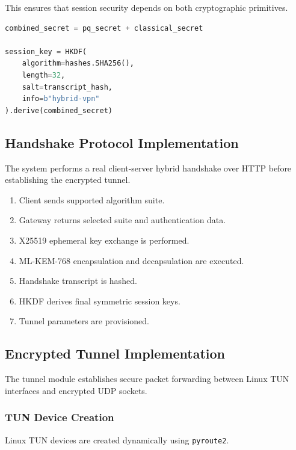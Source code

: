 This ensures that session security depends on both cryptographic primitives.

\begin{lstlisting}[language=Python, caption={Hybrid Session Key Derivation}]
combined_secret = pq_secret + classical_secret

session_key = HKDF(
    algorithm=hashes.SHA256(),
    length=32,
    salt=transcript_hash,
    info=b"hybrid-vpn"
).derive(combined_secret)
\end{lstlisting}

\subsection{Handshake Protocol Implementation}
\label{subsec:handshake_protocol}

The system performs a real client-server hybrid handshake over HTTP before establishing the encrypted tunnel.

\begin{enumerate}
    \item Client sends supported algorithm suite.
    \item Gateway returns selected suite and authentication data.
    \item X25519 ephemeral key exchange is performed.
    \item ML-KEM-768 encapsulation and decapsulation are executed.
    \item Handshake transcript is hashed.
    \item HKDF derives final symmetric session keys.
    \item Tunnel parameters are provisioned.
\end{enumerate}



\subsection{Encrypted Tunnel Implementation}
\label{subsec:tunnel_implementation}

The tunnel module establishes secure packet forwarding between Linux TUN interfaces and encrypted UDP sockets.

\subsubsection{TUN Device Creation}

Linux TUN devices are created dynamically using \texttt{pyroute2}.

